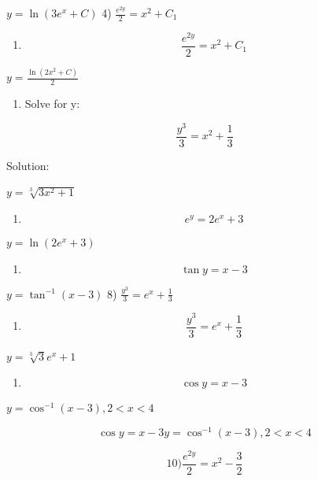 \documentclass[
]{article}
\providecommand{\tightlist}{%
  \setlength{\itemsep}{0pt}\setlength{\parskip}{0pt}}
\begin{document}
\(y = \ln (3e^x + C)\) 4) \(\frac{e^{2y}}{2} = x^2 + C_1\)

\begin{enumerate}
\def\labelenumi{\arabic{enumi})}
\setcounter{enumi}{3}
\tightlist
\item
  \[\frac{e^{2y}}{2} = x^2 + C_1\]
\end{enumerate}

\(y = \frac{\ln(2x^2 + C)}{2}\)

\begin{enumerate}
\def\labelenumi{\arabic{enumi})}
\setcounter{enumi}{4}
\tightlist
\item
  Solve for y:
\end{enumerate}

\[\frac{y^3}{3} = x^2 + \frac{1}{3}\]

Solution:

\(y = \sqrt[3]{3x^2 + 1}\)

\begin{enumerate}
\def\labelenumi{\arabic{enumi})}
\setcounter{enumi}{5}
\tightlist
\item
  \[e^y = 2e^x + 3\]
\end{enumerate}

\(y = \ln (2e^x + 3)\)

\begin{enumerate}
\def\labelenumi{\arabic{enumi})}
\setcounter{enumi}{6}
\tightlist
\item
  \[\tan y = x - 3\]
\end{enumerate}

\(y = \tan^{-1}(x - 3)\) 8) \(\frac{y^3}{3} = e^x + \frac{1}{3}\)

\begin{enumerate}
\def\labelenumi{\arabic{enumi})}
\setcounter{enumi}{7}
\tightlist
\item
  \[\frac{y^3}{3} = e^x + \frac{1}{3}\]
\end{enumerate}

\(y = \sqrt[3]{3}e^x + 1\)

\begin{enumerate}
\def\labelenumi{\arabic{enumi})}
\setcounter{enumi}{8}
\tightlist
\item
  \[\cos y = x - 3\]
\end{enumerate}

\(y = \cos^{-1}(x - 3), 2 < x < 4\)

\[\cos y = x - 3 y = \cos^{-1}(x - 3), 2 < x < 4\]

\[10) \frac{e^{2y}}{2} = x^2 - \frac{3}{2}\]
\end{document}
